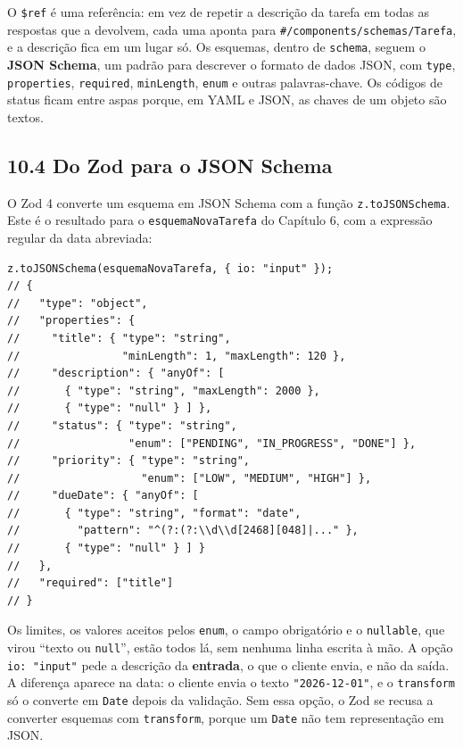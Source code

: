 O \texttt{\$ref} é uma referência: em vez de repetir a descrição da tarefa em todas as respostas que a devolvem, cada uma aponta para \texttt{\#/components/schemas/Tarefa}, e a descrição fica em um lugar só. Os esquemas, dentro de \texttt{schema}, seguem o \textbf{JSON Schema}, um padrão para descrever o formato de dados JSON, com \texttt{type}, \texttt{properties}, \texttt{required}, \texttt{minLength}, \texttt{enum} e outras palavras-chave. Os códigos de status ficam entre aspas porque, em YAML e JSON, as chaves de um objeto são textos.

\subsection{10.4 Do Zod para o JSON Schema}

O Zod 4 converte um esquema em JSON Schema com a função \texttt{z.toJSONSchema}. Este é o resultado para o \texttt{esquemaNovaTarefa} do Capítulo 6, com a expressão regular da data abreviada:

\begin{codigo}
\begin{Verbatim}[breaklines=true, breaksymbolleft={}, fontsize=\footnotesize]
z.toJSONSchema(esquemaNovaTarefa, { io: "input" });
// {
//   "type": "object",
//   "properties": {
//     "title": { "type": "string",
//                "minLength": 1, "maxLength": 120 },
//     "description": { "anyOf": [
//       { "type": "string", "maxLength": 2000 },
//       { "type": "null" } ] },
//     "status": { "type": "string",
//                 "enum": ["PENDING", "IN_PROGRESS", "DONE"] },
//     "priority": { "type": "string",
//                   "enum": ["LOW", "MEDIUM", "HIGH"] },
//     "dueDate": { "anyOf": [
//       { "type": "string", "format": "date",
//         "pattern": "^(?:(?:\\d\\d[2468][048]|..." },
//       { "type": "null" } ] }
//   },
//   "required": ["title"]
// }
\end{Verbatim}
\end{codigo}

Os limites, os valores aceitos pelos \texttt{enum}, o campo obrigatório e o \texttt{nullable}, que virou ``texto ou \texttt{null}'', estão todos lá, sem nenhuma linha escrita à mão. A opção \texttt{io: "input"} pede a descrição da \textbf{entrada}, o que o cliente envia, e não da saída. A diferença aparece na data: o cliente envia o texto \texttt{"2026-12-01"}, e o \texttt{transform} só o converte em \texttt{Date} depois da validação. Sem essa opção, o Zod se recusa a converter esquemas com \texttt{transform}, porque um \texttt{Date} não tem representação em JSON.

